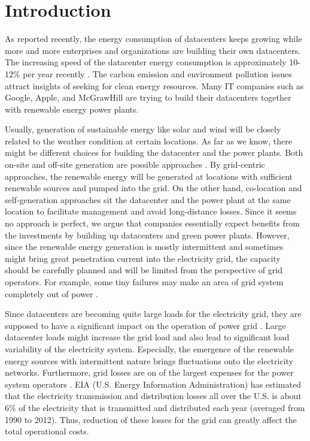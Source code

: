 \section{Introduction}
\label{sec:intro}

As reported recently, the energy consumption of datacenters keeps growing while more and more enterprises and organizations are building their own datacenters\cite{urgaonkar2011optimal,Koomey2011}. The increasing speed of the datacenter energy consumption is approximately 10-12\% per year recently \cite{ghatikar2014demand}. The carbon emission and environment pollution issues attract insights of seeking for clean energy resources. Many IT companies such as Google\cite{GoogleGreen}, Apple\cite{Apple13}, and McGrawHill\cite{McGrawHill11} are trying to build their datacenters together with renewable energy power plants.

Usually, generation of sustainable energy like solar and wind will be closely related to the weather condition at certain locations. As far as we know, there might be different choices for building the datacenter and the power plants. Both on-site and off-site generation are possible approaches \cite {Goiri13}. By grid-centric approaches, the renewable energy will be generated at locations with sufficient renewable sources and pumped into the grid. On the other hand, co-location and self-generation approaches sit the datacenter and the power plant at the same location to facilitate management and avoid long-distance losses. Since it seems no approach is perfect, we argue that companies essentially expect benefits from the investments by building up datacenters and green power plants. However, since the renewable energy generation is mostly intermittent and sometimes might bring great penetration current into the electricity grid, the capacity should be carefully planned and will be limited from the perspective of grid operators. For example, some tiny failures may make an area of grid system completely out of power \cite{nytimes2014}.

Since datacenters are becoming quite large loads for the electricity grid, they are supposed to have a significant impact on the operation of power grid \cite{haowang2014grid}. Large datacenter loads might increase the grid load and also lead to significant load variability of the electricity system. Especially, the emergence of the renewable energy sources with intermittent nature brings fluctuations onto the electricity networks. Furthermore, grid losses are on of the largest expenses for the power system operators \cite{de2014investigation}. EIA (U.S. Energy Information Administration) \cite{EIA} has estimated that the electricity transmission and distribution losses all over the U.S. is about 6\% of the electricity that is transmitted and distributed each year (averaged from 1990 to 2012). Thus, reduction of these losses for the grid can greatly affect the total operational costs.

